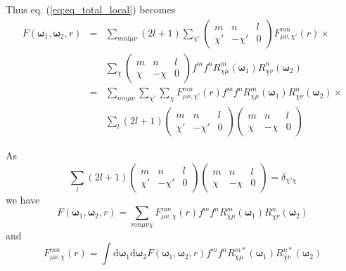 Thus eq. (\ref{eq:eq_total_local}) becomes
\begin{eqnarray}
F(\boldsymbol{\omega}_{1},\boldsymbol{\omega}_{2},r) & = & \sum_{mnl\mu\nu}\left(2l+1\right)\sum_{\chi'}\left(\begin{array}{ccc}
m & n & l\\
\chi' & -\chi' & 0
\end{array}\right)F_{\mu\nu,\chi'}^{mn}(r)\times\nonumber \\
 &  & \sum_{\chi}\left(\begin{array}{ccc}
m & n & l\\
\chi & -\chi & 0
\end{array}\right)f^{m}f^{n}R_{\chi\mu}^{m}(\boldsymbol{\omega}_{1})R_{\underline{\chi}\nu}^{n}(\boldsymbol{\omega}_{2})\nonumber \\
 & = & \sum_{mn\mu\nu}\sum_{\chi'}\sum_{\chi}F_{\mu\nu,\chi'}^{mn}(r)f^{m}f^{n}R_{\chi\mu}^{m}(\boldsymbol{\omega}_{1})R_{\underline{\chi}\nu}^{n}(\boldsymbol{\omega}_{2})\times\nonumber \\
 &  & \sum_{l}\left(2l+1\right)\left(\begin{array}{ccc}
m & n & l\\
\chi' & -\chi' & 0
\end{array}\right)\left(\begin{array}{ccc}
m & n & l\\
\chi & -\chi & 0
\end{array}\right)
\end{eqnarray}

As
\begin{equation}
\sum_{l}\left(2l+1\right)\left(\begin{array}{ccc}
m & n & l\\
\chi' & -\chi' & 0
\end{array}\right)\left(\begin{array}{ccc}
m & n & l\\
\chi & -\chi & 0
\end{array}\right)=\delta_{\chi'\chi}
\end{equation}
we have
\begin{equation}
F(\boldsymbol{\omega}_{1},\boldsymbol{\omega}_{2},r)=\sum_{mn\mu\nu\chi}F_{\mu\nu,\chi}^{mn}(r)f^{m}f^{n}R_{\chi\mu}^{m}(\boldsymbol{\omega}_{1})R_{\underline{\chi}\nu}^{n}(\boldsymbol{\omega}_{2})\label{eq:local-forward}
\end{equation}
and
\begin{equation}
F_{\mu\nu,\chi}^{mn}(r)=\int\mathrm{d}\boldsymbol{\omega}_{1}\mathrm{d}\boldsymbol{\omega}_{2}F(\boldsymbol{\omega}_{1},\boldsymbol{\omega}_{2},r)f^{m}f^{n}R_{\chi\mu}^{m*}(\boldsymbol{\omega}_{1})R_{\underline{\chi}\nu}^{n*}(\boldsymbol{\omega}_{2})\label{eq:local_backward}
\end{equation}

